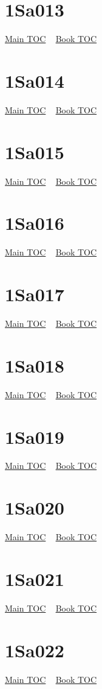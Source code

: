\documentclass{book}
\begin{document}
  \section{1Sa013}\hyperlink{toc}{Main TOC} ~ \hyperref[subsec:1Sa]{Book TOC} 
  \section{1Sa014}\hyperlink{toc}{Main TOC} ~ \hyperref[subsec:1Sa]{Book TOC} 
  \section{1Sa015}\hyperlink{toc}{Main TOC} ~ \hyperref[subsec:1Sa]{Book TOC} 
  \section{1Sa016}\hyperlink{toc}{Main TOC} ~ \hyperref[subsec:1Sa]{Book TOC} 
  \section{1Sa017}\hyperlink{toc}{Main TOC} ~ \hyperref[subsec:1Sa]{Book TOC} 
  \section{1Sa018}\hyperlink{toc}{Main TOC} ~ \hyperref[subsec:1Sa]{Book TOC} 
  \section{1Sa019}\hyperlink{toc}{Main TOC} ~ \hyperref[subsec:1Sa]{Book TOC} 
  \section{1Sa020}\hyperlink{toc}{Main TOC} ~ \hyperref[subsec:1Sa]{Book TOC} 
  \section{1Sa021}\hyperlink{toc}{Main TOC} ~ \hyperref[subsec:1Sa]{Book TOC} 
  \section{1Sa022}\hyperlink{toc}{Main TOC} ~ \hyperref[subsec:1Sa]{Book TOC} 
\end{document}
